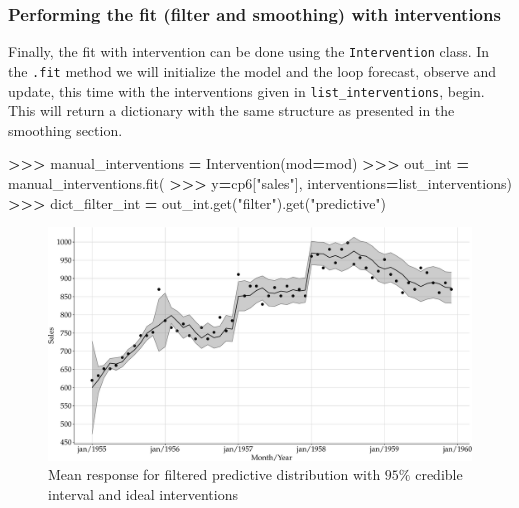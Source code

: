 \documentclass[
]{article}
\newenvironment{Shaded}{\begin{snugshade}}{\end{snugshade}}
\newcommand{\NormalTok}[1]{#1}
\newcommand{\OperatorTok}[1]{\textcolor[rgb]{0.81,0.36,0.00}{\textbf{#1}}}
\newcommand{\StringTok}[1]{\textcolor[rgb]{0.31,0.60,0.02}{#1}}
\begin{document}
\hypertarget{performing-the-fit-filter-and-smoothing-with-interventions}{%
\subsubsection{Performing the fit (filter and smoothing) with
interventions}\label{performing-the-fit-filter-and-smoothing-with-interventions}}

Finally, the fit with intervention can be done using the
\texttt{Intervention} class. In the \texttt{.fit} method we will
initialize the model and the loop forecast, observe and update, this
time with the interventions given in \texttt{list\_interventions},
begin. This will return a dictionary with the same structure as
presented in the smoothing section.

\begin{Shaded}
\begin{Highlighting}[]
\OperatorTok{\textgreater{}\textgreater{}\textgreater{}}\NormalTok{ manual\_interventions }\OperatorTok{=}\NormalTok{ Intervention(mod}\OperatorTok{=}\NormalTok{mod)}
\OperatorTok{\textgreater{}\textgreater{}\textgreater{}}\NormalTok{ out\_int }\OperatorTok{=}\NormalTok{ manual\_interventions.fit(}
\OperatorTok{\textgreater{}\textgreater{}\textgreater{}}\NormalTok{     y}\OperatorTok{=}\NormalTok{cp6[}\StringTok{"sales"}\NormalTok{], interventions}\OperatorTok{=}\NormalTok{list\_interventions)}
\OperatorTok{\textgreater{}\textgreater{}\textgreater{}}\NormalTok{ dict\_filter\_int }\OperatorTok{=}\NormalTok{ out\_int.get(}\StringTok{"filter"}\NormalTok{).get(}\StringTok{"predictive"}\NormalTok{)}
\end{Highlighting}
\end{Shaded}

\begin{figure}

{\centering \includegraphics[width=0.9\linewidth]{pybats_detection_files/figure-latex/plot-fit-cp6-filter-intervention-1} 

}

\caption{Mean response for filtered predictive distribution with $95\%$ credible interval and ideal interventions}\label{fig:plot-fit-cp6-filter-intervention}
\end{figure}
\end{document}
